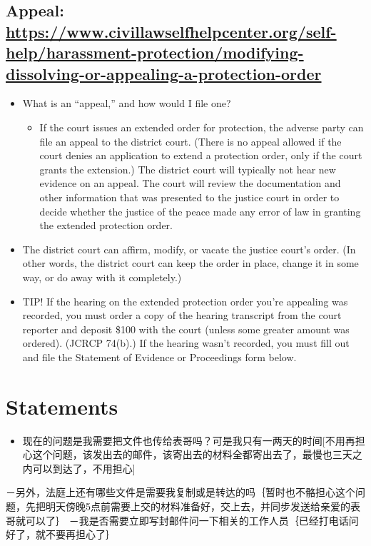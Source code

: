 \documentclass[9pt, b5paaper]{book}
\begin{document}
\section{Appeal: \url{https://www.civillawselfhelpcenter.org/self-help/harassment-protection/modifying-dissolving-or-appealing-a-protection-order}}
\label{sec-3-1}
\begin{itemize}
\item What is an “appeal,” and how would I file one?
\begin{itemize}
\item If the court issues an extended order for protection, the adverse party can file an appeal to the district court. (There is no appeal allowed if the court denies an application to extend a protection order, only if the court grants the extension.) The district court will typically not hear new evidence on an appeal. The court will review the documentation and other information that was presented to the justice court in order to decide whether the justice of the peace made any error of law in granting the extended protection order.
\end{itemize}
\item The district court can affirm, modify, or vacate the justice court’s order. (In other words, the district court can keep the order in place, change it in some way, or do away with it completely.)
\item TIP!  If the hearing on the extended protection order you're appealing was recorded, you must order a copy of the hearing transcript from the court reporter and deposit \$100 with the court (unless some greater amount was ordered).  (JCRCP 74(b).)  If the hearing wasn't recorded, you must fill out and file the Statement of Evidence or Proceedings form below.
\end{itemize}

\chapter{Statements}
\label{sec-4}
\begin{itemize}
\item 现在的问题是我需要把文件也传给表哥吗？可是我只有一两天的时间[不用再担心这个问题，该发出去的邮件，该寄出去的材料全都寄出去了，最慢也三天之内可以到达了，不用担心]
\end{itemize}
－另外，法庭上还有哪些文件是需要我复制或是转达的吗｛暂时也不骼担心这个问题，先把明天傍晚5点前需要上交的材料准备好，交上去，并同步发送给亲爱的表哥就可以了｝
－我是否需要立即写封邮件问一下相关的工作人员｛已经打电话问好了，就不要再担心了｝
\end{document}
